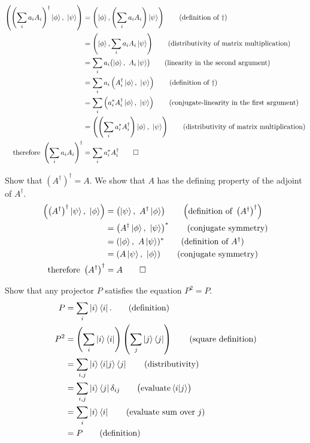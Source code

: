 \begin{align*}
	\left(\left(\sum_ia_i A_i\right)^\dagger \ket{\phi},\ \ket{\psi} \right)
	&= \left(\ket{\phi},\left(\sum_ia_i A_i\right) \ket{\psi}\right) \tag{definition of $\dagger$}\\
	&= \left(\ket{\phi}, \sum_ia_iA_i\ket{\psi}\right) \tag{distributivity of matrix multiplication}\\
	&= \sum_ia_i \bigl(\ket{\phi},\ A_i \ket{\psi}\bigr) \tag{linearity in the second argument}\\
	&= \sum_ia_i \left(A_i^\dagger \ket{\phi},\ \ket{\psi}\right) \tag{definition of $\dagger$}\\
	&= \sum_i\left(a_i^* A_i^\dagger \ket{\phi},\ \ket{\psi}\right) \tag{conjugate-linearity in the first argument}\\
	&= \left(\left(\sum_ia_i^* A_i^\dagger\right) \ket{\phi},\ \ket{\psi}\right) \tag{distributivity of matrix multiplication}\\
%
	\text{therefore } \left(\sum_ia_i A_i\right)^\dagger &= \sum_ia_i^* A_i^\dagger \tag*{$\square$}
\end{align*}

 Show that $\left(A^\dagger\right)^\dagger = A$.
\Soln We show that $A$ has the defining property of the adjoint of $A^\dagger$. 
\begin{align*}
	\left(\left(A^\dagger\right)^\dagger\ket{\psi},\ \ket{\phi} \right)
	&= \left(\ket{\psi},\ A^\dagger \ket{\phi}\right) \tag*{$\left(\text{definition of } \left(A^\dagger\right)^\dagger\right)$}\\
	&= \left(A^\dagger \ket{\phi},\ \ket{\psi}\right)^* \tag{conjugate symmetry}\\
	&= (\ket{\phi},\ A\ket{\psi})^* \tag{definition of $A^\dagger$}\\
	&= (A\ket{\psi},\ \ket{\phi}) \tag{conjugate symmetry}\\
	\text{therefore } \left(A^\dagger\right)^\dagger &= A \tag*{$\square$}
\end{align*}

 Show that any projector $P$ satisfies the equation $P^2 = P$.
\begin{align*}
	P &= \sum_i \ket{i}\bra{i}. \tag{definition}\\
	P^2 &= \left(\sum_i \ket{i}\bra{i}\right) \left(\sum_j \ket{j}\bra{j}\right) \tag{square definition}\\
	&= \sum_{i,j} \ket{i}\braket{i | j}\bra{j} \tag{distributivity}\\
	&= \sum_{i,j} \ket{i}\bra{j} \delta_{ij} \tag*{$\bigl(\text{evaluate} \braket{i | j}\bigr)$}\\
	&= \sum_i \ket{i}\bra{i}\tag{evaluate sum over $j$}\\
	&= P \tag{definition}
\end{align*}

